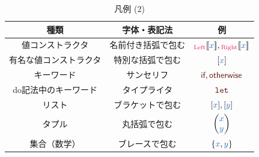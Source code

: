 \documentclass[a5paper,twoside,fleqn,draft]{jsbook}
\begin{document}
\begin{table}[p]
\caption{凡例 (2)}
\begin{center}
\begin{tabular}{||c|c|c||}
\hline
種類&字体・表記法&例\\
\hline\hline
値コンストラクタ&名前付き括弧で包む&$\hLeftWith{\hVar{x}},\hRightWith{\hVar{x}}$\\
有名な値コンストラクタ&特別な括弧で包む&$\hListWith{\hVar{x}}$\\
\hline
キーワード&サンセリフ&$\hIf,\hOtherwise$\\
do記法中のキーワード&タイプライタ&$\hDoLet$\\
\hline
リスト&ブラケットで包む&$\hListWith{\hVar{x}},\hListWith{\hVar{y}}$\\
タプル&丸括弧で包む&$\hPairWith{\hVar{x}}{\hVar{y}}$\\
\hline
集合（数学）&ブレースで包む&$\{\hVar{x},\hVar{y}\}$\\
\hline
\end{tabular}
\end{center}
\end{table}
\end{document}

